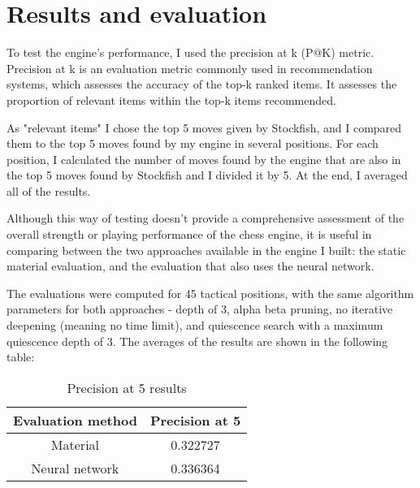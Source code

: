 \chapter{Results and evaluation}
\label{chap:ch6}


To test the engine's performance, I used the precision at k (P@K) metric. Precision at k is an evaluation metric commonly used in recommendation systems, which assesses the accuracy of the top-k ranked items. It assesses the proportion of relevant items within the top-k items recommended.

As "relevant items" I chose the top 5 moves given by Stockfish, and I compared them to the top 5 moves found by my engine in several positions. For each position, I calculated the number of moves found by the engine that are also in the top 5 moves found by Stockfish and I divided it by 5. At the end, I averaged all of the results.

Although this way of testing doesn't provide a comprehensive assessment of the overall strength or playing performance of the chess engine, it is useful in comparing between the two approaches available in the engine I built: the static material evaluation, and the evaluation that also uses the neural network.

The evaluations were computed for 45 tactical positions, with the same algorithm parameters for both approaches - depth of 3, alpha beta pruning, no iterative deepening (meaning no time limit), and quiescence search with a maximum quiescence depth of 3. The averages of the results are shown in the following table:


\begin{table}[h]
    \centering
    \begin{tabular}{ |c|c| }
        \hline
        \textbf{Evaluation method} & \textbf{Precision at 5} \\
        \hline
        Material & 0.322727 \\
        \hline
        Neural network & 0.336364 \\
        \hline
    \end{tabular}
    \caption{Precision at 5 results}
    \label{table:precision}
\end{table}

